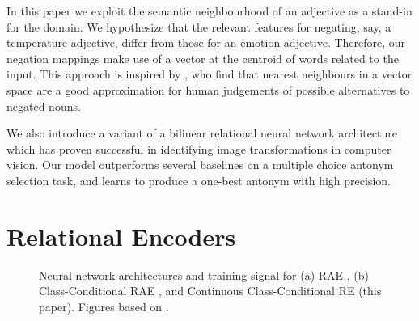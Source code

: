 \documentclass[11pt]{article}
\begin{document}
In this paper we exploit the semantic neighbourhood of an adjective
as a stand-in for the domain. We hypothesize that the relevant
features for negating, say, a temperature adjective, differ from those
for an emotion adjective. Therefore, our negation mappings make use of a
vector at the centroid of words related to the input.
This approach is inspired by \citet{kruszewski:16},
 who find that nearest neighbours in a vector space are a good approximation for human judgements of possible alternatives to negated nouns.

We also introduce a variant of a bilinear relational neural network architecture which has proven successful in 
identifying image transformations in computer vision. Our model outperforms several baselines on a
multiple choice antonym selection task, and learns to produce a
one-best antonym with high precision.


\section{Relational Encoders}

\begin{figure}[h!t]
\centering
{}
\quad
{}
\quad
{}
\vspace{-4mm}
\caption{Neural network architectures and training signal for (a) RAE \citep{memisevic:13}, (b) Class-Conditional RAE \citep{rudy:15}, and Continuous Class-Conditional RE (this paper). Figures based on \citet{memisevic:13}.}
\label{f:arch}
\end{figure}
\end{document}
